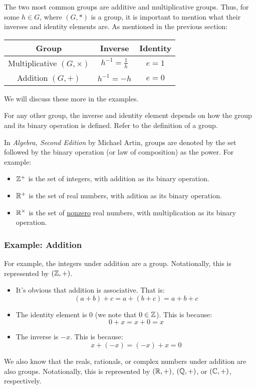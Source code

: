 \documentclass[letterpaper]{article}
\begin{document}
\begin{note*}{}{}
    The two most common groups are additive and multiplicative groups. Thus, for some $h \in G$, where $(G, *)$ is a group, it is important to mention what their inverses and identity elements are. As mentioned in the previous section:
    \begin{center}
        \begin{tabular}{|c|c|c|}
            \hline 
            \textbf{Group} & \textbf{Inverse} & \textbf{Identity} \\ 
            \hline 
            Multiplicative $(G, \times)$ & $h^{-1} = \frac{1}{h}$ & $e = 1$ \\ 
            Addition $(G, +)$ & $h^{-1} = -h$ & $e = 0$ \\ 
            \hline 
        \end{tabular}
    \end{center}
    We will discuss these more in the examples. 

    \bigskip 

    For any other group, the inverse and identity element depends on how the group and its binary operation is defined. Refer to the definition of a group.
\end{note*}

\begin{note*}{}{}
    In \emph{Algebra, Second Edition} by Michael Artin, groups are denoted by the set followed by the binary operation (or law of composition) as the power. For example: 
    \begin{itemize}
        \item $\mathbb{Z}^+$ is the set of integers, with addition as its binary operation.
        \item $\mathbb{R}^+$ is the set of real numbers, with adition as its binary operation. 
        \item $\mathbb{R}^{\times}$ is the set of \underline{nonzero} real numbers, with multiplication as its binary operation.
    \end{itemize} 
\end{note*}

\subsubsection{Example: Addition}
For example, the integers under addition are a group. Notationally, this is represented by $(\mathbb{Z}, +)$. 
\begin{itemize}
    \item It's obvious that addition is associative. That is:
    \[(a + b) + c = a + (b + c) = a + b + c\]

    \item The identity element is 0 (we note that $0 \in \mathbb{Z}$). This is because:
    \[0 + x = x + 0 = x\]

    \item The inverse is $-x$. This is because:
    \[x + (-x) = (-x) + x = 0\]
\end{itemize}
We also know that the reals, rationals, or complex numbers under addition are also groups. Notationally, this is represented by $(\mathbb{R}, +)$, $(\mathbb{Q}, +)$, or $(\mathbb{C}, +)$, respectively. 
\end{document}
